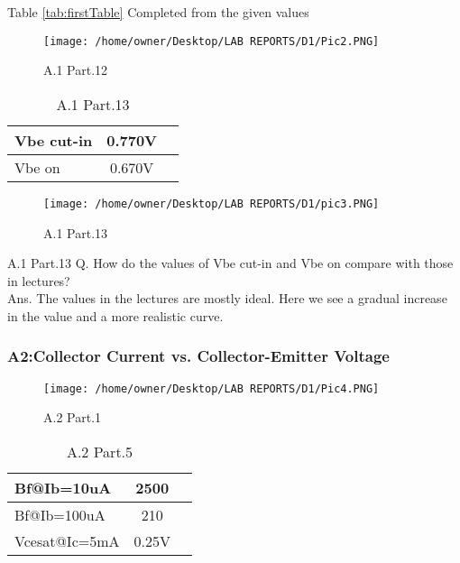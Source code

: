 \documentclass{article}
\begin{document}
Table \ref{tab:firstTable} Completed from the given values

\begin{figure}[H]
	\centering
	\texttt{[image: /home/owner/Desktop/LAB REPORTS/D1/Pic2.PNG]}
	\caption[A.1 Part.12 Plot ]{A.1 Part.12}
	\label{fig:pic}
\end{figure}

\begin{table}[H]

	\centering
	\label{tab:secondTable}
	\caption[A.1 Part.13 Table]{A.1 Part.13}
	\begin{tabular}{lcr}
	Vbe cut-in&0.770V \\ \hline
	Vbe on&0.670V\\ \hline
		
	\end{tabular}
\end{table}

\begin{figure}[H]
	\centering
	\texttt{[image: /home/owner/Desktop/LAB REPORTS/D1/pic3.PNG]}
	\caption[A.1 Part.13 Plot]{A.1 Part.13}
	\label{fig:pic}
\end{figure}
\pagebreak

A.1 Part.13
Q. How do the values of Vbe cut-in and Vbe on compare with those in lectures?\\
Ans. The values in the lectures are mostly ideal. Here we see a gradual increase in the value and a more realistic curve.

\subsubsection{A2:Collector Current vs. Collector-Emitter Voltage}

\begin{figure}[H]
	\centering
	\texttt{[image: /home/owner/Desktop/LAB REPORTS/D1/Pic4.PNG]}
	\caption[A.2 electronic set-up]{A.2 Part.1}
	\label{fig:pic}
\end{figure}


\begin{table}[H]
	\centering
	\label{tab:thirdTable}
	\caption[A.2 Part.5 Plot values Table]{A.2 Part.5}
	\begin{tabular}{lcr}
		Bf@Ib=10uA&2500 \\ \hline
		Bf@Ib=100uA&210\\ \hline
		Vcesat@Ic=5mA&0.25V\\ \hline
	\end{tabular}
\end{table}
\end{document}
